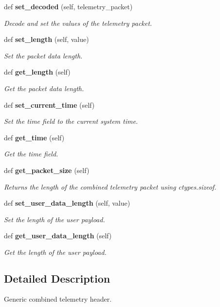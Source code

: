 \begin{DoxyCompactItemize}
def {\bf set\+\_\+decoded} (self, telemetry\+\_\+packet)
\begin{DoxyCompactList}\small\item\em Decode and set the values of the telemetry packet. \end{DoxyCompactList}\item 
def {\bf set\+\_\+length} (self, value)
\begin{DoxyCompactList}\small\item\em Set the packet data length. \end{DoxyCompactList}\item 
def {\bf get\+\_\+length} (self)
\begin{DoxyCompactList}\small\item\em Get the packet data length. \end{DoxyCompactList}\item 
def {\bf set\+\_\+current\+\_\+time} (self)
\begin{DoxyCompactList}\small\item\em Set the time field to the current system time. \end{DoxyCompactList}\item 
def {\bf get\+\_\+time} (self)
\begin{DoxyCompactList}\small\item\em Get the time field. \end{DoxyCompactList}\item 
def {\bf get\+\_\+packet\+\_\+size} (self)
\begin{DoxyCompactList}\small\item\em Returns the length of the combined telemetry packet using ctypes.\+sizeof. \end{DoxyCompactList}\item 
def {\bf set\+\_\+user\+\_\+data\+\_\+length} (self, value)
\begin{DoxyCompactList}\small\item\em Set the length of the user payload. \end{DoxyCompactList}\item 
def {\bf get\+\_\+user\+\_\+data\+\_\+length} (self)
\begin{DoxyCompactList}\small\item\em Get the length of the user payload. \end{DoxyCompactList}\end{DoxyCompactItemize}


\subsection{Detailed Description}
Generic combined telemetry header. 




